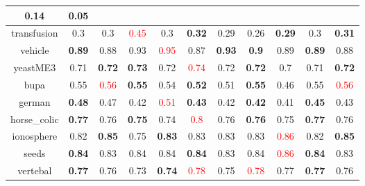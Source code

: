 \documentclass{article}%
\begin{document}
\begin{tabular}{c|cccccccccc}
{0.14
}&0.05\\%
\hline%
transfusion&0.3&0.3&\textcolor{red}{ 
0.45
}&0.3&\textbf{0.32}&0.29&0.26&\textbf{0.29}&0.3&\textbf{0.31}\\%
\hline%
vehicle&\textbf{0.89}&0.88&0.93&\textcolor{red}{ 
0.95
}&0.87&\textbf{0.93}&\textbf{0.9}&0.89&\textbf{0.89}&0.88\\%
\hline%
yeastME3&0.71&\textbf{0.72}&\textbf{0.73}&0.72&\textcolor{red}{ 
0.74
}&0.72&\textbf{0.72}&0.7&0.71&\textbf{0.72}\\%
\hline%
bupa&0.55&\textcolor{red}{ 
0.56
}&\textbf{0.55}&0.54&\textbf{0.52}&0.51&\textbf{0.55}&0.46&0.55&\textcolor{red}{ 
0.56
}\\%
\hline%
german&\textbf{0.48}&0.47&0.42&\textcolor{red}{ 
0.51
}&\textbf{0.43}&0.42&\textbf{0.42}&0.41&\textbf{0.45}&0.43\\%
\hline%
horse\_colic&\textbf{0.77}&0.76&\textbf{0.75}&0.74&\textcolor{red}{ 
0.8
}&0.76&\textbf{0.76}&0.75&\textbf{0.77}&0.76\\%
\hline%
ionosphere&0.82&\textbf{0.85}&0.75&\textbf{0.83}&0.83&0.83&0.83&\textcolor{red}{ 
0.86
}&0.82&\textbf{0.85}\\%
\hline%
seeds&\textbf{0.84}&0.83&0.84&0.84&\textbf{0.84}&0.83&0.84&\textcolor{red}{ 
0.86
}&\textbf{0.84}&0.83\\%
\hline%
vertebal&\textbf{0.77}&0.76&0.73&\textbf{0.74}&\textcolor{red}{ 
0.78
}&0.75&\textcolor{red}{ 
0.78
}&0.77&\textbf{0.77}&0.76\\%
\hline%
\end{tabular}

%
\end{document}
